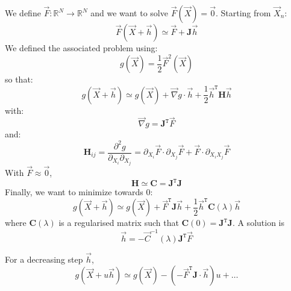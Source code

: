 \documentclass[aps,12pt]{revtex4}
\newcommand{\trn}[1]{{#1}^{\mathtt{T}}}
\begin{document}
We define $\vec{F} : \mathbb{R}^N \rightarrow \mathbb{R}^N$ and we want to solve $\vec{F}(\vec{X})=\vec{0}$.
Starting from $\vec{X}_n$:
\begin{equation}
	\vec{F}(\vec{X} + \vec{h}) \simeq \vec{F} + \bm{J} \vec{h}
\end{equation}
We defined the associated problem using:
\begin{equation}
	g(\vec{X}) = \frac{1}{2} \vec{F}^2(\vec{X}) 
\end{equation}
so that:
\begin{equation}
	g(\vec{X}+\vec{h}) \simeq g(\vec{X}) + \vec{\nabla}g \cdot \vec{h} + \frac{1}{2} \trn{\vec{h}} \bm{H} \vec{h}
\end{equation}
with:
\begin{equation}
	\vec{\nabla}g =  \trn{\bm{J}} \vec{F}
\end{equation}
and:
\begin{equation}
	\bm{H}_{ij} = \dfrac{\partial^2 g}{\partial_{X_i}\partial_{X_j}} = \partial_{X_i} \vec{F} \cdot \partial_{X_j} \vec{F} + \vec{F} \cdot \partial_{X_iX_j} \vec{F}
\end{equation}
With $\vec{F}\approx\vec0$,
\begin{equation}
	\bm{H} \simeq \bm{C}  = \trn{\bm{J}} \bm{J}
\end{equation}
Finally, we want to minimize towards $0$:
\begin{equation}
	g(\vec{X} +\vec{h}) \simeq g(\vec{X}) + \trn{\vec{F}} \bm{J}  \vec{h} + \frac{1}{2} \trn{\vec{h}} \bm{C} (\lambda) \vec{h}
\end{equation}
where $\bm{C}(\lambda)$ is a regularised matrix such that $\bm{C}(0)=\trn{\bm{J}}\bm{J}$.
A solution is
\begin{equation}
	\vec{h} = -\vec{C}^{-1}(\lambda) \trn{\bm{J}} \vec{F}
\end{equation}

For a decreasing step $\vec{h}$, 
\begin{equation}
	g(\vec{X}+u\vec{h}) \simeq g(\vec{X}) - (-\trn{\vec{F}} \bm{J} \cdot \vec{h}) u + \ldots
\end{equation}
\end{document}
